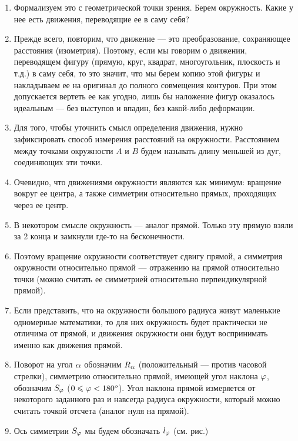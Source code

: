 \begin{enumerate}
\item Формализуем это с геометрической точки зрения. Берем окружность. Какие у нее есть движения, переводящие ее в саму себя?
\item Прежде всего, повторим, что движение --- это преобразование, сохраняющее расстояния (изометрия). Поэтому, если мы говорим о движении, переводящем фигуру (прямую, круг, квадрат, многоугольник, плоскость и т.д.) в саму себя, то это значит, что мы берем копию этой фигуры и накладываем ее на оригинал до полного совмещения контуров. При этом допускается вертеть ее как угодно, лишь бы наложение фигур оказалось идеальным --- без выступов и впадин, без какой-либо деформации.
\item Для того, чтобы уточнить смысл определения движения, нужно зафиксировать способ измерения расстояний на окружности.  Расстоянием между точками окружности $A$ и $B$  будем называть длину меньшей из дуг, соединяющих эти точки.
\item Очевидно, что движениями окружности являются как минимум: вращение вокруг ее центра, а также симметрии относительно прямых, проходящих через ее центр.
\item В некотором смысле окружность --- аналог прямой. Только эту прямую взяли за 2 конца и замкнули где-то на бесконечности.
\item Поэтому вращение окружности соответствует сдвигу прямой, а симметрия окружности относительно прямой --- отражению на прямой относительно точки (можно считать ее симметрией относительно перпендикулярной прямой).
\item Если представить, что на окружности большого радиуса живут маленькие одномерные математики, то для них окружность будет практически не отличима от прямой, и движения окружности они будут воспринимать именно как движения прямой.
\item Поворот на угол $\alpha$ обозначим $R_\alpha$ (положительный --- против часовой стрелки), симметрию относительно прямой, имеющей угол наклона $\varphi$, обозначим $S_\varphi$ ($0\leqslant\varphi<180^o$). Угол наклона прямой измеряется от некоторого заданного раз и навсегда радиуса окружности, который можно считать точкой отсчета (аналог нуля на прямой).
\item Ось симметрии $S_\varphi$ мы будем обозначать $l_\varphi$ (см. рис.)


\end{enumerate}
